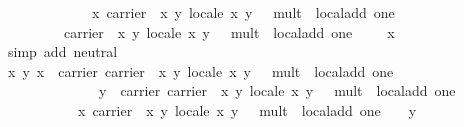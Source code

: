\begin{isabellebody}
\ \ \ \ \ \ \ \ \ \ \ \ \ x\ {\isasymotimes}\isactrlbsub {\isasymlparr}carrier\ {\isacharequal}\ {\isacharbraceleft}{\isacharparenleft}x{\isacharcomma}\ y{\isacharparenright}{\isachardot}\ local{\isachardot}e\ x\ y\ {\isacharequal}\ {}{\isacharbraceright}{\isacharcomma}\ mult\ {\isacharequal}\ local{\isachardot}add{\isacharcomma}\ one\ {\isacharequal}\ {\isacharparenleft}{}{\isacharcomma}\ {}{\isacharparenright}{\isasymrparr}\isactrlesub \isanewline
\ \ \ \ \ \ \ \ \ {\isasymone}\isactrlbsub {\isasymlparr}carrier\ {\isacharequal}\ {\isacharbraceleft}{\isacharparenleft}x{\isacharcomma}\ y{\isacharparenright}{\isachardot}\ local{\isachardot}e\ x\ y\ {\isacharequal}\ {}{\isacharbraceright}{\isacharcomma}\ mult\ {\isacharequal}\ local{\isachardot}add{\isacharcomma}\ one\ {\isacharequal}\ {\isacharparenleft}{}{\isacharcomma}\ {}{\isacharparenright}{\isasymrparr}\isactrlesub \ {\isacharequal}\ x{\isachardoublequoteclose}\isanewline
\ \ \ \ \isamarkupfalse%
\ {\isacharparenleft}simp\ add{\isacharcolon}\ neutral{\isacharparenright}\isanewline
{}\isamarkupfalse%
\isanewline
\ \ \isamarkupfalse%
\ {\isachardoublequoteopen}{\isasymAnd}x\ y{\isachardot}\ x\ {\isasymin}\ carrier\ {\isasymlparr}carrier\ {\isacharequal}\ {\isacharbraceleft}{\isacharparenleft}x{\isacharcomma}\ y{\isacharparenright}{\isachardot}\ local{\isachardot}e\ x\ y\ {\isacharequal}\ {}{\isacharbraceright}{\isacharcomma}\ mult\ {\isacharequal}\ local{\isachardot}add{\isacharcomma}\ one\ {\isacharequal}\ {\isacharparenleft}{}{\isacharcomma}\ {}{\isacharparenright}{\isasymrparr}\ {\isasymLongrightarrow}\isanewline
\ \ \ \ \ \ \ \ \ \ \ \ \ \ y\ {\isasymin}\ carrier\ {\isasymlparr}carrier\ {\isacharequal}\ {\isacharbraceleft}{\isacharparenleft}x{\isacharcomma}\ y{\isacharparenright}{\isachardot}\ local{\isachardot}e\ x\ y\ {\isacharequal}\ {}{\isacharbraceright}{\isacharcomma}\ mult\ {\isacharequal}\ local{\isachardot}add{\isacharcomma}\ one\ {\isacharequal}\ {\isacharparenleft}{}{\isacharcomma}\ {}{\isacharparenright}{\isasymrparr}\ {\isasymLongrightarrow}\isanewline
\ \ \ \ \ \ \ \ \ \ \ x\ {\isasymotimes}\isactrlbsub {\isasymlparr}carrier\ {\isacharequal}\ {\isacharbraceleft}{\isacharparenleft}x{\isacharcomma}\ y{\isacharparenright}{\isachardot}\ local{\isachardot}e\ x\ y\ {\isacharequal}\ {}{\isacharbraceright}{\isacharcomma}\ mult\ {\isacharequal}\ local{\isachardot}add{\isacharcomma}\ one\ {\isacharequal}\ {\isacharparenleft}{}{\isacharcomma}\ {}{\isacharparenright}{\isasymrparr}\isactrlesub \ y\ {\isacharequal}\isanewline

\end{isabellebody}
